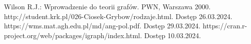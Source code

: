 
\begin{thebibliography}{4}
 Wilson R.J.: Wprowadzenie do teorii grafów. PWN, Warszawa 2000.
 http://student.krk.pl/026-Ciosek-Grybow/rodzaje.html. Dostęp 26.03.2024.
 https://wms.mat.agh.edu.pl/\texttildelow md/ang-pol.pdf. Dostęp 29.03.2024.
 https://cran.r-project.org/web/packages/igraph/index.html. Dostęp 10.03.2024.
\end{thebibliography}